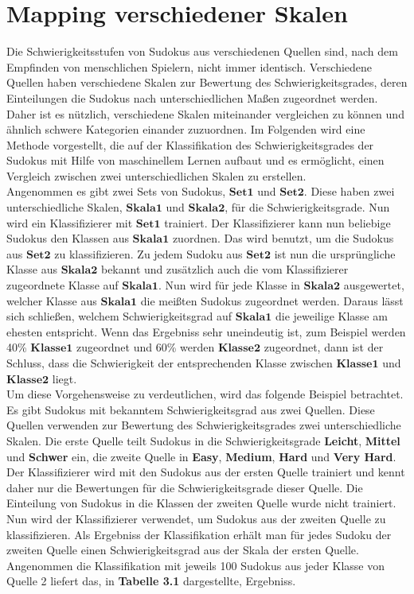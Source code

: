 \newpage
\section{Mapping verschiedener Skalen}
\label{Mapping}
Die Schwierigkeitsstufen von Sudokus aus verschiedenen Quellen sind, nach dem Empfinden von menschlichen Spielern, nicht immer identisch. Verschiedene Quellen haben verschiedene Skalen zur Bewertung des Schwierigkeitsgrades, deren Einteilungen die Sudokus nach unterschiedlichen Maßen zugeordnet werden. Daher ist es nützlich, verschiedene Skalen miteinander vergleichen zu können und ähnlich schwere Kategorien einander zuzuordnen. Im Folgenden wird eine Methode vorgestellt, die auf der Klassifikation des Schwierigkeitsgrades der Sudokus mit Hilfe von maschinellem Lernen aufbaut und es ermöglicht, einen Vergleich zwischen zwei unterschiedlichen Skalen zu erstellen.\\
Angenommen es gibt zwei Sets von Sudokus, $\mathbf{Set 1}$ und $\mathbf{Set 2}$. Diese haben zwei unterschiedliche Skalen, $\mathbf{Skala 1}$ und $\mathbf{Skala 2}$, für die Schwierigkeitsgrade. Nun wird ein Klassifizierer mit $\mathbf{Set 1}$ trainiert. Der Klassifizierer kann nun beliebige Sudokus den Klassen aus $\mathbf{Skala 1}$ zuordnen. Das wird benutzt, um die Sudokus aus $\mathbf{Set 2}$ zu klassifizieren. Zu jedem Sudoku aus $\mathbf{Set 2}$ ist nun die ursprüngliche Klasse aus $\mathbf{Skala 2}$ bekannt und zusätzlich auch die vom Klassifizierer zugeordnete Klasse auf $\mathbf{Skala 1}$. Nun wird für jede Klasse in $\mathbf{Skala 2}$ ausgewertet, welcher Klasse aus $\mathbf{Skala 1}$ die meißten Sudokus zugeordnet werden. Daraus lässt sich schließen, welchem Schwierigkeitsgrad auf $\mathbf{Skala 1}$ die jeweilige Klasse am ehesten entspricht. Wenn das Ergebniss sehr uneindeutig ist, zum Beispiel werden 40\% $\mathbf{Klasse 1}$ zugeordnet und 60\% werden $\mathbf{Klasse 2}$ zugeordnet, dann ist der Schluss, dass die Schwierigkeit der entsprechenden Klasse zwischen $\mathbf{Klasse 1}$ und $\mathbf{Klasse 2}$ liegt.\\
Um diese Vorgehensweise zu verdeutlichen, wird das folgende Beispiel betrachtet. Es gibt Sudokus mit bekanntem Schwierigkeitsgrad aus zwei Quellen. Diese Quellen verwenden zur Bewertung des Schwierigkeitsgrades zwei unterschiedliche Skalen. Die erste Quelle teilt Sudokus in die Schwierigkeitsgrade \textbf{Leicht}, \textbf{Mittel} und \textbf{Schwer} ein, die zweite Quelle in \textbf{Easy}, \textbf{Medium}, \textbf{Hard} und \textbf{Very Hard}. Der Klassifizierer wird mit den Sudokus aus der ersten Quelle trainiert und kennt daher nur die Bewertungen für die Schwierigkeitsgrade dieser Quelle. Die Einteilung von Sudokus in die Klassen der zweiten Quelle wurde nicht trainiert. Nun wird der Klassifizierer verwendet, um Sudokus aus der zweiten Quelle zu klassifizieren. Als Ergebniss der Klassifikation erhält man für jedes Sudoku der zweiten Quelle einen Schwierigkeitsgrad aus der Skala der ersten Quelle. Angenommen die Klassifikation mit jeweils 100 Sudokus aus jeder Klasse von Quelle 2 liefert das, in \textbf{Tabelle 3.1} dargestellte, Ergebniss.\\
